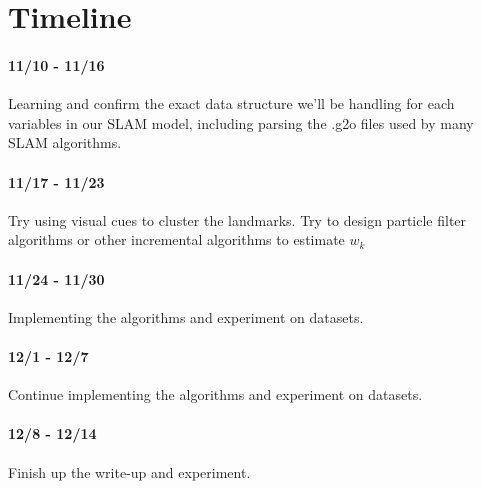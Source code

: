 \section{Timeline}
\paragraph{11/10 - 11/16} Learning and confirm the exact data structure we'll be handling for each variables in our SLAM model, including parsing the .g2o files\cite{g2o} used by many SLAM algorithms.
\paragraph{11/17 - 11/23} Try using visual cues to cluster the landmarks. Try to design particle filter algorithms or other incremental algorithms to estimate $w_k$
\paragraph{11/24 - 11/30} Implementing the algorithms and experiment on datasets.
\paragraph{12/1 - 12/7} Continue implementing the algorithms and experiment on datasets.
\paragraph{12/8 - 12/14} Finish up the write-up and  experiment.

